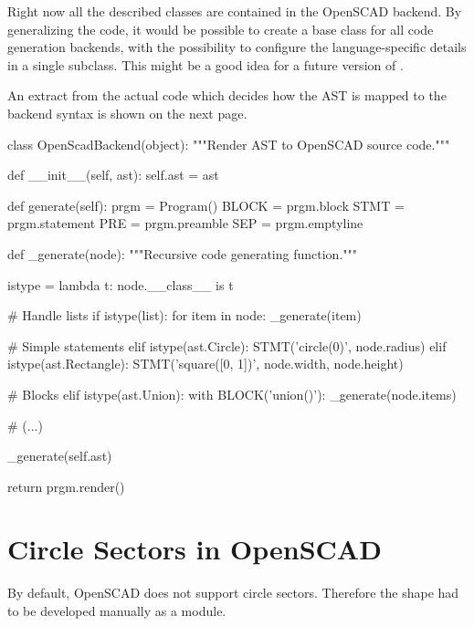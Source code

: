Right now all the described classes are contained in the OpenSCAD backend. By
generalizing the code, it would be possible to create a base class for all code
generation backends, with the possibility to configure the language-specific
details in a single subclass. This might be a good idea for a future version of
\tangible{}.

An extract from the actual code which decides how the AST is mapped to the
backend syntax is shown on the next page.

\vspace{.5\baselineskip}
\begin{pythoncode}
class OpenScadBackend(object):
    """Render AST to OpenSCAD source code."""

    def __init__(self, ast):
        self.ast = ast

    def generate(self):
        prgm = Program()
        BLOCK = prgm.block
        STMT = prgm.statement
        PRE = prgm.preamble
        SEP = prgm.emptyline

        def _generate(node):
            """Recursive code generating function."""

            istype = lambda t: node.__class__ is t

            # Handle lists
            if istype(list):
                for item in node:
                    _generate(item)

            # Simple statements
            elif istype(ast.Circle):
                STMT('circle({0})', node.radius)
            elif istype(ast.Rectangle):
                STMT('square([{0}, {1}])', node.width, node.height)

            # Blocks
            elif istype(ast.Union):
                with BLOCK('union()'):
                    _generate(node.items)

            # (...)

        _generate(self.ast)

        return prgm.render()
\end{pythoncode}


\newpage
\section{Circle Sectors in OpenSCAD}\label{sec:design:circlesectors}

By default, OpenSCAD does not support circle sectors. Therefore the shape had to
be developed manually as a module.

